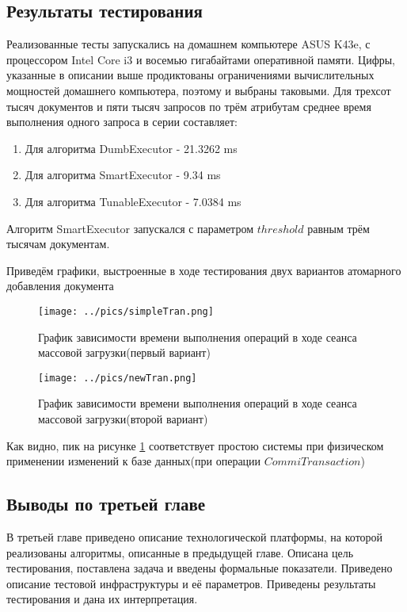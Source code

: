 \documentclass{matmex-diploma}
\begin{document}
    \subsection{Результаты тестирования}
        Реализованные тесты запускались на домашнем компьютере ASUS K43e, с процессором Intel Core i3 и восемью гигабайтами оперативной памяти. Цифры, указанные в описании выше продиктованы ограничениями вычислительных мощностей домашнего компьютера, поэтому и выбраны таковыми.
        Для трехсот тысяч документов и пяти тысяч запросов по трём атрибутам среднее время выполнения одного запроса в серии составляет:
        \begin{enumerate}
            \item Для алгоритма DumbExecutor - 21.3262 ms
            \item Для алгоритма SmartExecutor - 9.34  ms
            \item Для алгоритма TunableExecutor - 7.0384 ms 
        \end{enumerate}
        
        Алгоритм SmartExecutor запускался с параметром $threshold$ равным трём тысячам документам.
        
        Приведём графики, выстроенные в ходе тестирования двух вариантов атомарного добавления документа
        
        \begin{figure}[H]
            \centering
            \texttt{[image: ../pics/simpleTran.png]}
            \caption{График зависимости времени выполнения операций в ходе сеанса массовой загрузки(первый вариант)}
            \label{simpleTran}
        \end{figure}
        
        \begin{figure}[H]
            \centering
            \texttt{[image: ../pics/newTran.png]}
            \caption{График зависимости времени выполнения операций в ходе сеанса массовой загрузки(второй вариант)}
            \label{newTran}
        \end{figure}
        
        Как видно, пик на рисунке \ref{simpleTran} соответствует простою системы при физическом применении изменений к базе данных(при операции $CommiTransaction$)
        
        \subsection{Выводы по третьей главе}
            В третьей главе приведено описание технологической платформы, на которой реализованы алгоритмы, описанные в предыдущей главе. Описана цель тестирования, поставлена задача и введены формальные показатели. Приведено описание тестовой инфраструктуры и её параметров. Приведены результаты тестирования и дана их интерпретация. 
    
\end{document}
